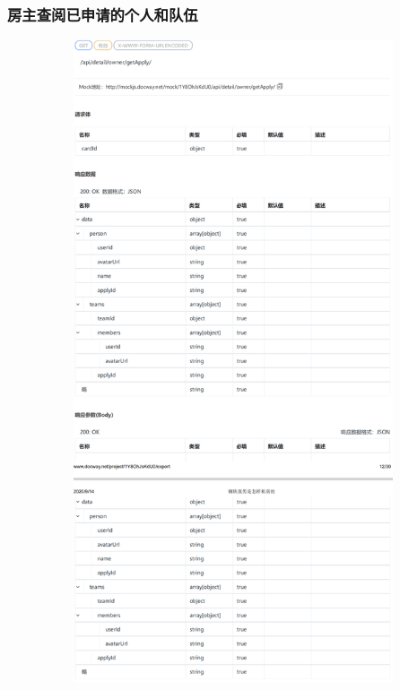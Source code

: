                     \subsubsection{房主查阅已申请的个人和队伍} 
                    \begin{figure}[h]
                        \centering
                        \includegraphics[height=19.0cm,width=14.0cm]{design/image/api12.png} 
                        \end{figure}  
                        \newpage   
